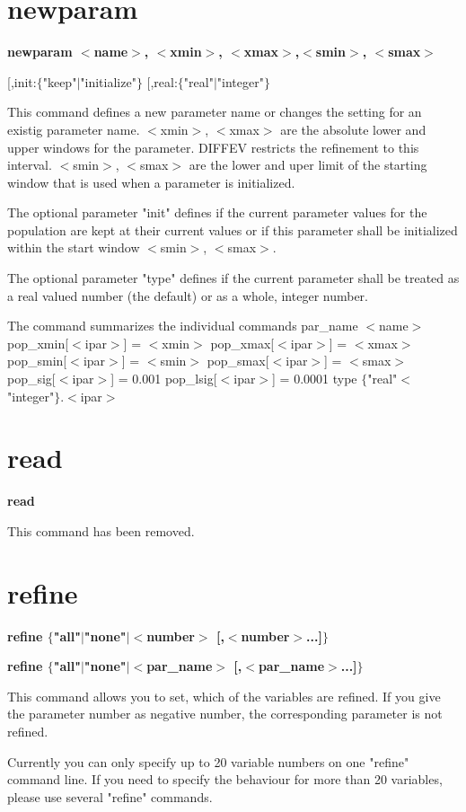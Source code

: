 \section{newparam}
{\bf newparam $ <$name$> $, $ <$xmin$> $, $ <$xmax$> $,$ <$smin$> $, $ <$smax$> $ \par }
\vspace{3pt}
         [,init:$ \{$"keep"$| $"initialize"$\} $ 
         [,real:$ \{$"real"$| $"integer"$\} $ 
\par
This command defines a new parameter name or changes the setting for 
an existig parameter name. 
$ <$xmin$> $, $ <$xmax$> $ are the absolute lower and upper windows for the 
               parameter. DIFFEV restricts the refinement to this 
               interval. 
$ <$smin$> $, $ <$smax$> $ are the lower and uper limit of the starting 
               window that is used when a parameter is initialized. 
\par
The optional parameter "init" defines if the current parameter 
values for the population are kept at their current values or if 
this parameter shall be initialized within the start window 
$ <$smin$> $, $ <$smax$> $. 
\par
The optional parameter "type" defines if the current parameter 
shall be treated as a real valued number (the default) or as a 
whole, integer number. 
\par
The command summarizes the individual commands 
  par\_name $ <$name$> $ 
  pop\_xmin[$ <$ipar$> $] = $ <$xmin$> $ 
  pop\_xmax[$ <$ipar$> $] = $ <$xmax$> $ 
  pop\_smin[$ <$ipar$> $] = $ <$smin$> $ 
  pop\_smax[$ <$ipar$> $] = $ <$smax$> $ 
  pop\_sig[$ <$ipar$> $]  = 0.001 
  pop\_lsig[$ <$ipar$> $] = 0.0001 
  type $ \{$"real"$ <$"integer"$\} $.$ <$ipar$> $ 
\par
\section{read}
{\bf read \par }
\par
\vspace{3pt}
This command has been removed. 
\section{refine}
{\bf refine $ \{$"all"$| $"none"$| $$ <$number$> $ [,$ <$number$> $...]$\} $ \par }
{\bf refine $ \{$"all"$| $"none"$| $$ <$par\_name$> $ [,$ <$par\_name$> $...]$\} $ \par }
\par
\vspace{3pt}
This command allows you to set, which of the variables are refined. 
If you give the parameter number as negative number, the corresponding 
parameter is not refined. 
\par
Currently you can only specify up to 20 variable numbers on 
one "refine" command line. If you need to specify the behaviour 
for more than 20 variables, please use several "refine" commands. 
